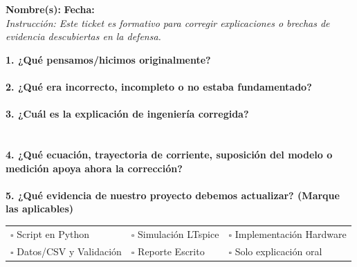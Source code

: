 \documentclass[11pt, a4paper]{article}
\begin{document}
\begin{tcolorbox}[colback=white, colframe=black, title={\large \textbf{Ticket de Corrección - Hito 1 (PFI)}}]
\textbf{Nombre(s):} \hrulefill \hfill \textbf{Fecha:} \hrulefill \\[0.3cm]
\textit{Instrucción: Este ticket es formativo para corregir explicaciones o brechas de evidencia descubiertas en la defensa.}

\vspace{0.3cm}
\textbf{1. ¿Qué pensamos/hicimos originalmente?}\\[0.4cm]
\hrulefill \\[0.4cm]
\textbf{2. ¿Qué era incorrecto, incompleto o no estaba fundamentado?}\\[0.4cm]
\hrulefill \\[0.4cm]
\textbf{3. ¿Cuál es la explicación de ingeniería corregida?}\\[0.4cm]
\hrulefill \\[0.4cm]
\hrulefill \\[0.4cm]
\textbf{4. ¿Qué ecuación, trayectoria de corriente, suposición del modelo o medición apoya ahora la corrección?}\\[0.4cm]
\hrulefill \\[0.4cm]
\textbf{5. ¿Qué evidencia de nuestro proyecto debemos actualizar? (Marque las aplicables)}\\
\begin{tabularx}{\textwidth}{X X X}
$\square$ Script en Python & $\square$ Simulación LTspice & $\square$ Implementación Hardware \\
$\square$ Datos/CSV y Validación & $\square$ Reporte Escrito & $\square$ Solo explicación oral \\
\end{tabularx}
\end{tcolorbox}
\end{document}
